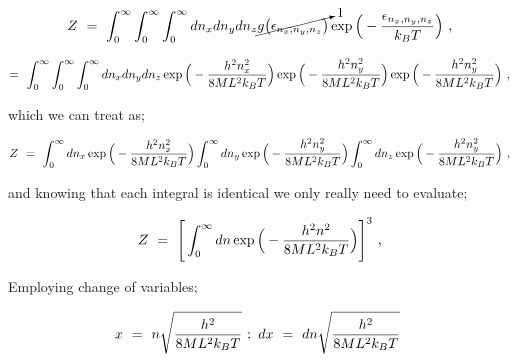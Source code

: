 \documentclass{article}
\begin{document}
\begin{equation} \label{eb-eq-256-100}
Z \hspace{0.125cm} = \hspace{0.125cm} \int_{0}^{\infty} \int_{0}^{\infty} \int_{0}^{\infty} d n_x d n_y d n_z \cancelto{1}{g \big( \epsilon_{n_x, n_y, n_z} \big)} \exp{\Big(-\frac{\epsilon_{n_x, n_y, n_z}}{k_B T} \Big)} \hspace{0.125cm} ,
\end{equation}

\begin{equation} \label{eb-eq-256-101}
= \hspace{0.125cm} \int_{0}^{\infty} \int_{0}^{\infty} \int_{0}^{\infty} d n_x d n_y d n_z \exp{\Big(-\frac{h^2 n_x^2}{8 M L^2 k_B T} \Big)} \exp{\Big(-\frac{h^2 n_y^2}{8 M L^2 k_B T} \Big)} \exp{\Big(-\frac{h^2 n_y^2}{8 M L^2 k_B T} \Big)} \hspace{0.125cm} ,
\end{equation}

which we can treat as;

\begin{equation} \label{eb-eq-256-102}
Z \hspace{0.125cm} = \hspace{0.125cm} \int_{0}^{\infty} d n_x \exp{\Big(-\frac{h^2 n_x^2}{8 M L^2 k_B T} \Big)} \int_{0}^{\infty} d n_y \exp{\Big(-\frac{h^2 n_y^2}{8 M L^2 k_B T} \Big)} \int_{0}^{\infty} d n_z \exp{\Big(-\frac{h^2 n_y^2}{8 M L^2 k_B T} \Big)} \hspace{0.125cm} ,
\end{equation}

and knowing that each integral is identical we only really need to evaluate;

\begin{equation} \label{eb-eq-256-103}
Z \hspace{0.125cm} = \hspace{0.125cm} \Bigg[ \int_{0}^{\infty} d n \exp{\Big(-\frac{h^2 n^2}{8 M L^2 k_B T} \Big)} \Bigg]^3 \hspace{0.125cm} ,
\end{equation}

Employing change of variables;

\begin{equation} \label{eb-eq-256-104}
x \hspace{0.125cm} = \hspace{0.125cm} n \sqrt{\frac{h^2}{8 M L^2 k_B T}} \hspace{0.125cm} ; \hspace{0.125cm} d x \hspace{0.125cm} = \hspace{0.125cm} d n \sqrt{\frac{h^2}{8 M L^2 k_B T}} \hspace{0.125cm}
\end{equation}
\end{document}
